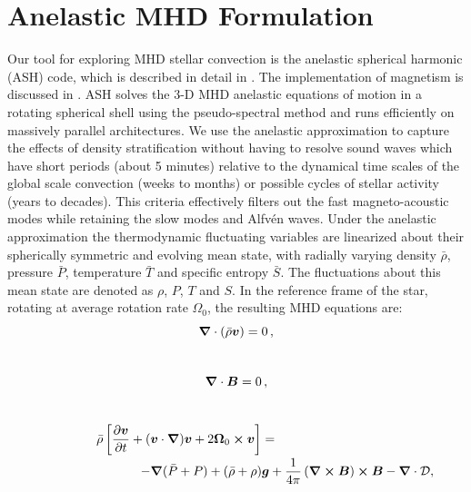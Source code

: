 \section{Anelastic MHD Formulation}
Our tool for exploring MHD stellar convection is the anelastic spherical
harmonic (ASH) code, which is described 
in detail in \cite{Clune_et_al_1999}.  The implementation of magnetism
is discussed in \cite{Brun_et_al_2004}.   
ASH solves the 3-D MHD anelastic equations of motion in a
rotating spherical shell using the pseudo-spectral method and runs
efficiently on massively parallel architectures. 
We use the anelastic approximation to capture the effects of density
stratification without having to resolve sound waves which have short
periods (about 5 minutes) relative to the dynamical time scales of the
global scale convection (weeks to months) or possible cycles of
stellar activity (years to decades).  This criteria effectively filters
out the fast magneto-acoustic modes while retaining the slow modes and
Alfv\'en waves.
Under the anelastic approximation the thermodynamic fluctuating
variables are linearized about their spherically symmetric and
evolving mean state, with radially varying density $\bar{\rho}$, pressure $\bar{P}$,
temperature $\bar{T}$ and specific entropy $\bar{S}$.  The fluctuations
about this mean state are denoted as $\rho$, $P$, $T$ and $S$.  
In the reference frame of the star, rotating at average rotation rate $\Omega_0$, 
the resulting MHD equations are:
%
\begin{equation}
  \label{eq:div mass flux}
  \boldsymbol{\nabla} \cdot(\bar{\rho}\boldsymbol{v}) = 0\thinspace,
\end{equation}\\[-15mm]
%
\begin{equation}
  \label{eq:div B}
  \boldsymbol{\nabla} \cdot\boldsymbol{B} = 0\thinspace,
\end{equation}\\[-10mm]
%
\begin{equation}
  \label{eq:momentum}
  \begin{array}{c}
  \displaystyle \bar{\rho}\left[ \frac{\partial\boldsymbol{v}}{\partial t} +
    (\boldsymbol{v} \cdot \boldsymbol{\nabla})\boldsymbol{v} +
    2 \boldsymbol{\Omega}_0 \boldsymbol{\times} \boldsymbol{v} \right] 
  =  \qquad\qquad\qquad\qquad\\[3mm]
  \displaystyle
  \qquad\qquad\qquad\qquad  -\boldsymbol{\nabla} (\bar{P} + P) + (\bar{\rho} + \rho) \boldsymbol{g}
                +\frac{1}{4 \pi} \left(\boldsymbol{\nabla} \boldsymbol{\times} \boldsymbol{B} \right) \boldsymbol{\times} \boldsymbol{B} 
                -\boldsymbol{\nabla} \cdot \mathcal{D} ,
  \end{array}
\end{equation}\\[-5mm]
